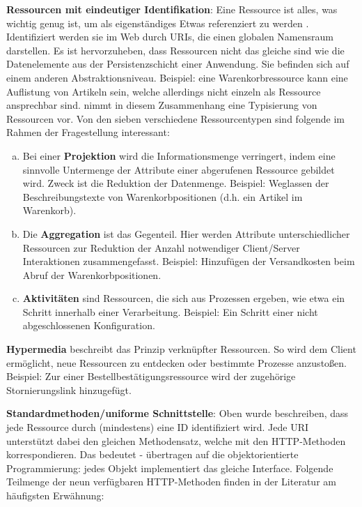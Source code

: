 \documentclass[12pt,a4paper,bibliography=totocnumbered,listof=totoc]{scrartcl}
\begin{document}
\begin{compactitem}
\item \textbf{Ressourcen mit eindeutiger Identifikation}: \glqq Eine Ressource ist alles, was wichtig genug ist, um als eigenständiges Etwas referenziert zu werden\grqq{} \citep{richardson07}. Identifiziert werden sie im Web durch URIs, die einen globalen Namensraum darstellen.  Es ist hervorzuheben, dass Ressourcen nicht das gleiche sind wie die Datenelemente aus der Persistenzschicht einer Anwendung. Sie befinden sich auf einem anderen Abstraktionsniveau. Beispiel: eine Warenkorbressource kann eine Auflistung von Artikeln sein, welche allerdings nicht einzeln als Ressource ansprechbar sind. \citeauthor{tilkov11} nimmt in diesem Zusammenhang eine Typisierung von Ressourcen vor. Von den sieben verschiedene Ressourcentypen sind folgende im Rahmen der Fragestellung interessant:
\begin{enumerate}[a.]
\item Bei einer \textbf{Projektion} wird die Informationsmenge verringert, indem eine sinnvolle Untermenge der Attribute einer abgerufenen Ressource gebildet wird. Zweck ist die Reduktion der Datenmenge. Beispiel: Weglassen der Beschreibungstexte von Warenkorbpositionen (d.h. ein Artikel im Warenkorb).
\item Die \textbf{Aggregation} ist das Gegenteil. Hier werden Attribute unterschiedlicher Ressourcen zur Reduktion der Anzahl notwendiger Client/Server Interaktionen zusammengefasst. Beispiel: Hinzufügen der Versandkosten beim Abruf der Warenkorbpositionen.
\item \textbf{Aktivitäten} sind Ressourcen, die sich aus Prozessen ergeben, wie etwa ein Schritt innerhalb einer Verarbeitung. Beispiel: Ein Schritt einer nicht abgeschlossenen Konfiguration.
\end{enumerate}
\item \textbf{Hypermedia} beschreibt das Prinzip verknüpfter Ressourcen. So wird dem Client ermöglicht, neue Ressourcen zu entdecken oder bestimmte Prozesse anzustoßen. Beispiel: Zur einer Bestellbestätigungsressource wird der zugehörige Stornierungslink hinzugefügt.
\item \textbf{Standardmethoden/uniforme Schnittstelle}: Oben wurde beschreiben, dass jede Ressource durch (mindestens) eine ID identifiziert wird. Jede URI unterstützt dabei den gleichen Methodensatz, welche mit den HTTP-Methoden korrespondieren. Das bedeutet - übertragen auf die objektorientierte Programmierung: jedes Objekt implementiert das gleiche Interface. Folgende Teilmenge der neun verfügbaren HTTP-Methoden finden in der Literatur am häufigsten Erwähnung:

\end{compactitem}
\end{document}
